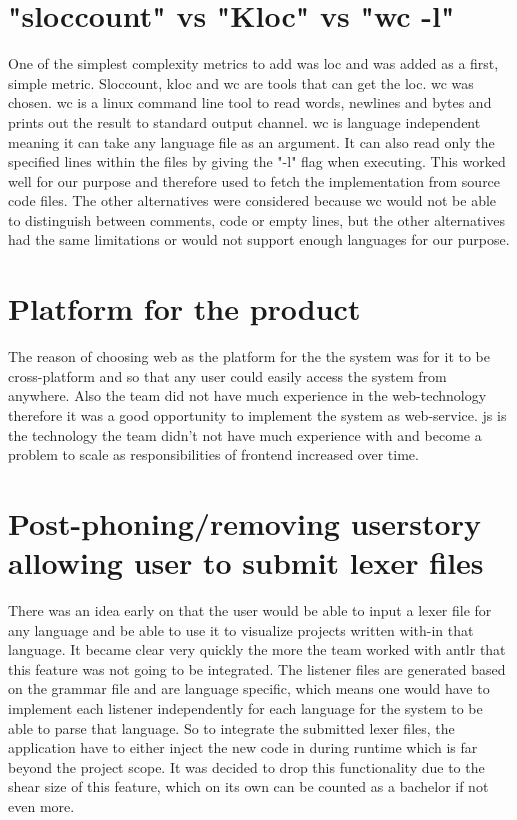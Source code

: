 \section{"sloccount" vs "Kloc" vs "wc -l"}
One of the simplest complexity metrics to add was \gls{loc} and was added as a first, simple metric. Sloccount, \gls{kloc} and wc are tools that can get the \gls{loc}. wc was chosen. 
wc is a linux command line tool to read words, newlines and bytes and prints out the result to standard output channel. wc is language independent meaning it can take any language file as an argument. It can also read only the specified lines within the files by giving the "-l" flag when executing. This worked well for our purpose and therefore used to fetch the implementation from source code files. The other alternatives were considered because wc would not be able to distinguish between comments, code or empty lines, but the other alternatives had the same limitations or would not support enough languages for our purpose. 

\section{Platform for the product}
The reason of choosing web as the platform for the the system was for it to be cross-platform and so that any user could easily access the system from anywhere. Also the team did not have much experience in the web-technology therefore it was a good opportunity to implement the system as web-service.
\gls{js} is the technology the team didn't not have much experience with and become a problem to scale as responsibilities of \gls{frontend} increased over time.

\section{Post-phoning/removing userstory allowing user to submit lexer files}
There was an idea early on that the user would be able to input a lexer file for any language and be able to use it to visualize projects written with-in that language. It became clear very quickly the more the team worked with \gls{antlr} that this feature was not going to be integrated. The listener files are generated based on the grammar file and are language specific, which means one would have to implement each listener independently for each language for the system to be able to parse that language. So to integrate the submitted lexer files, the application have to either inject the new code in during runtime which is far beyond the project scope. It was decided to drop this functionality due to the shear size of this feature, which on its own can be counted as a bachelor if not even more.